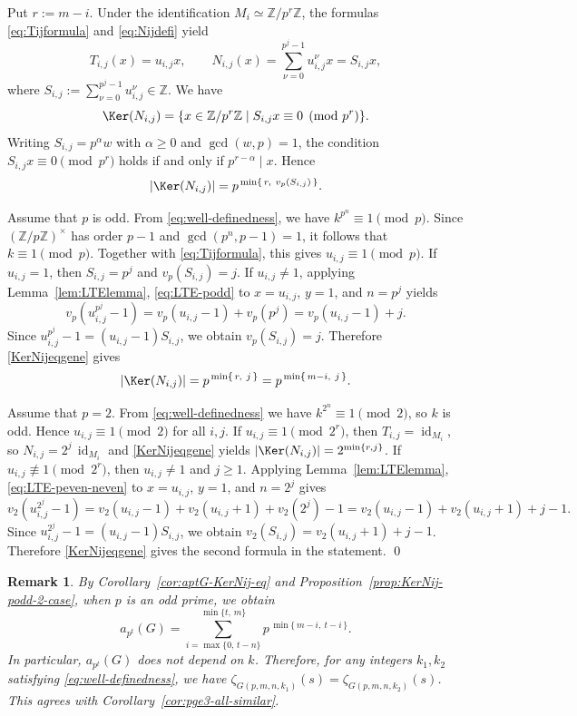 \documentclass[onecolumn]{article}
\makeatletter
\numberwithin{equation}{section}
\theoremstyle{mytheoremstyle}
\newtheorem{remark}[thm]{Remark}
\renewenvironment{proof}[1][\proofname]{%
  \par\normalfont 
  \topsep6pt\relax 
  \trivlist\item[\hskip\labelsep\itshape #1\@addpunct{.}]\ignorespaces
}{%
  \qed\endtrivlist\@endpefalse
}
\DeclareMathOperator{\id}{\mathrm{id}}
\makeatother
\begin{document}
\begin{proof}
Put $r:=m-i$.
Under the identification $M_i\simeq\mathbb{Z}/p^{r}\mathbb{Z}$, the formulas
\eqref{eq:Tijformula} and \eqref{eq:Nijdefi} yield
\[
  T_{i,j}(x)=u_{i,j}x,
  \qquad
  N_{i,j}(x)=\sum_{\nu=0}^{p^{j}-1}u_{i,j}^{\nu}x = S_{i,j}x,
\]
where $S_{i,j}:=\sum_{\nu=0}^{p^{j}-1}u_{i,j}^{\nu}\in\mathbb{Z}$. We have
\[
  \Ker(N_{i,j})
  =\{x\in\mathbb{Z}/p^{r}\mathbb{Z}\mid S_{i,j}x\equiv 0\pmod{p^{r}}\}.
\]
Writing $S_{i,j}=p^{\alpha}w$ with $\alpha\ge 0$ and $\gcd(w,p)=1$, the condition
$S_{i,j}x\equiv 0\pmod{p^{r}}$ holds if and only if $p^{r-\alpha}\mid x$.
Hence
\begin{equation}\label{KerNijeqgene}
  |\Ker(N_{i,j})|
  = p^{\,\min\{\,r,\ v_p(S_{i,j})\,\}}.
\end{equation}

Assume that $p$ is odd.
From \eqref{eq:well-definedness}, we have $k^{p^{n}}\equiv 1\pmod p$.
Since $(\mathbb{Z}/p\mathbb{Z})^{\times}$ has order $p-1$ and
$\gcd(p^{n},p-1)=1$, it follows that $k\equiv 1\pmod p$.
Together with \eqref{eq:Tijformula}, this gives $u_{i,j}\equiv 1\pmod p$.
If $u_{i,j}=1$, then $S_{i,j}=p^{j}$ and $v_p(S_{i,j})=j$.
If $u_{i,j}\neq 1$, applying Lemma~\ref{lem:LTElemma}, \eqref{eq:LTE-podd}
to $x=u_{i,j}$, $y=1$, and $n=p^{j}$ yields
\[
  v_p(u_{i,j}^{p^{j}}-1)=v_p(u_{i,j}-1)+v_p(p^{j})
  =v_p(u_{i,j}-1)+j.
\]
Since $u_{i,j}^{p^{j}}-1=(u_{i,j}-1)S_{i,j}$, we obtain $v_p(S_{i,j})=j$.
Therefore \eqref{KerNijeqgene} gives
\[
  |\Ker(N_{i,j})|
  =p^{\,\min\{\,r,\ j\,\}}
  =p^{\,\min\{\,m-i,\ j\,\}}.
\]

Assume that $p=2$.
From \eqref{eq:well-definedness} we have $k^{2^{n}}\equiv 1\pmod 2$, so $k$ is odd.
Hence $u_{i,j}\equiv 1\pmod 2$ for all $i,j$.
If $u_{i,j}\equiv 1\pmod{2^{r}}$, then $T_{i,j}=\id_{M_i}$, so
$N_{i,j}=2^{j}\,\id_{M_i}$ and \eqref{KerNijeqgene} yields
$|\Ker(N_{i,j})|=2^{\min\{r,j\}}$.
If $u_{i,j}\not\equiv 1\pmod{2^{r}}$, then $u_{i,j}\neq 1$ and $j\ge 1$.
Applying Lemma~\ref{lem:LTElemma}, \eqref{eq:LTE-peven-neven}
to $x=u_{i,j}$, $y=1$, and $n=2^{j}$ gives
\[
  v_2(u_{i,j}^{2^{j}}-1)
  =v_2(u_{i,j}-1)+v_2(u_{i,j}+1)+v_2(2^{j})-1
  =v_2(u_{i,j}-1)+v_2(u_{i,j}+1)+j-1.
\]
Since $u_{i,j}^{2^{j}}-1=(u_{i,j}-1)S_{i,j}$, we obtain
$v_2(S_{i,j})=v_2(u_{i,j}+1)+j-1$.
Therefore \eqref{KerNijeqgene} gives the second formula in the statement.
\end{proof}



\begin{remark}\label{remark:podd-anotherproof}
By Corollary~\ref{cor:aptG-KerNij-eq} and
Proposition~\ref{prop:KerNij-podd-2-case}, when $p$ is an odd
prime, we obtain
\[
a_{p^{t}}(G)
=
\sum_{i=\max\{0,\,t-n\}}^{\min\{t,\,m\}}
  p^{\,\min\{\,m-i,\ t-i\,\}}.\]
In particular, $a_{p^{t}}(G)$ does not depend on $k$.
Therefore, for any integers $k_{1},k_{2}$ satisfying \eqref{eq:well-definedness},
we have $\zeta_{G(p,m,n,k_{1})}(s)=\zeta_{G(p,m,n,k_{2})}(s)$.
This agrees with Corollary~\ref{cor:pge3-all-similar}.
\end{remark}
\end{document}
